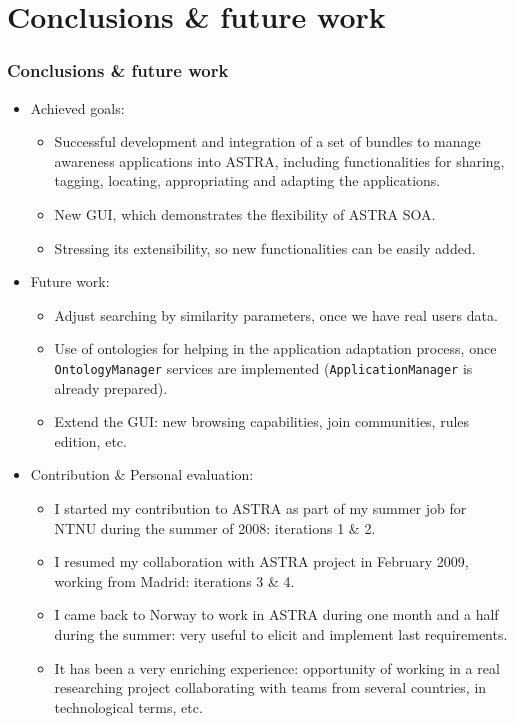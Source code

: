 
\section{Conclusions \& future work}

\begin{frame}

	\frametitle{Conclusions \& future work} 
	\begin{itemize}
	  \item Achieved goals:
	 	\begin{itemize}
	  		\item Successful development and integration of a set of
				bundles to manage awareness applications into ASTRA, including 
				functionalities for sharing, tagging, locating, appropriating and 
				adapting the applications.
			\item New GUI, which demonstrates the flexibility of ASTRA SOA.
			\item Stressing its extensibility, so new functionalities can be easily
			added.
		\end{itemize}	 
	\end{itemize}

	\begin{itemize}
	  \item Future work:
	 	\begin{itemize}
	  		\item Adjust searching by similarity parameters, once we have real users
	  	 	data.
			\item Use of ontologies for helping in the application adaptation process,
			once \texttt{OntologyManager} services are implemented
			(\texttt{ApplicationManager} is already prepared).
			\item Extend the GUI: new browsing capabilities, join communities, rules
			edition, etc.
		\end{itemize}	 
	\end{itemize}


\end{frame}

\begin{frame}

	\begin{itemize}
	  \item Contribution \& Personal evaluation:
	 	\begin{itemize}
	  		\item I started my contribution to ASTRA as part of my summer job for NTNU
	  		during the summer of 2008: iterations 1 \& 2.
			\item I resumed my collaboration with ASTRA project in February 2009,
			working from Madrid: iterations 3 \& 4.
			\item I came back to Norway to work in ASTRA during one month and a half
			during the summer: very useful to elicit and implement last requirements.
			\item It has been a very enriching experience: opportunity of working in a
			real researching project collaborating with teams from several
			countries, in technological terms, etc.
		\end{itemize}	 
	\end{itemize}

\end{frame}
